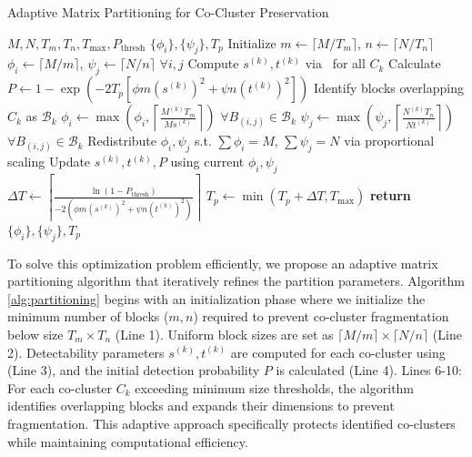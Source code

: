 \documentclass[journal]{IEEEtran}
\begin{document}
\begin{algorithm}[!t]
    \caption{Adaptive Matrix Partitioning for Co-Cluster Preservation}
    \begin{algorithmic}[1]
        \REQUIRE $M, N, T_m, T_n, T_{\text{max}}, P_{\text{thresh}}$
        \ENSURE $\{\phi_i\}, \{\psi_j\}, T_p$
        \STATE Initialize $m \gets \lceil M / T_m \rceil$, $n \gets \lceil N / T_n \rceil$ 
        \STATE $\phi_i \gets \lceil M/m \rceil$, $\psi_j \gets \lceil N/n \rceil$ $\forall i,j$ 
        \STATE Compute $s^{(k)}, t^{(k)}$ via~ for all $C_k$
        \STATE Calculate $P \gets 1 - \exp\left( -2 T_p \left[ \phi m (s^{(k)})^2 + \psi n (t^{(k)})^2 \right] \right)$
        \STATE Identify blocks overlapping $C_k$ as $\mathcal{B}_k$
        \STATE $\phi_i \gets \max\left( \phi_i, \left\lceil \frac{M^{(k)} T_m}{M s^{(k)}} \right\rceil \right)$ $\forall B_{(i,j)} \in \mathcal{B}_k$
        \STATE $\psi_j \gets \max\left( \psi_j, \left\lceil \frac{N^{(k)} T_n}{N t^{(k)}} \right\rceil \right)$ $\forall B_{(i,j)} \in \mathcal{B}_k$
        \ENDFOR
        \STATE Redistribute $\phi_i, \psi_j$ s.t. $\sum \phi_i = M$, $\sum \psi_j = N$ via proportional scaling
        \STATE Update $s^{(k)}, t^{(k)}, P$ using current $\phi_i, \psi_j$
        \STATE $\Delta T \gets \left\lceil \frac{\ln(1 - P_{\text{thresh}})}{-2 \left( \phi m (s^{(k)})^2 + \psi n (t^{(k)})^2 \right)} \right\rceil$
        \STATE $T_p \gets \min(T_p + \Delta T, T_{\text{max}})$
        \ENDIF
        \ENDWHILE
        \STATE \textbf{return} $\{\phi_i\}, \{\psi_j\}, T_p$
    \end{algorithmic}
    \label{alg:partitioning}
\end{algorithm}

To solve this optimization problem efficiently, we propose an adaptive matrix partitioning algorithm that iteratively refines the partition parameters. Algorithm \ref{alg:partitioning} begins with an initialization phase where we initialize the minimum number of blocks ($m,n$) required to prevent co-cluster fragmentation below size $T_m \times T_n$ (Line 1). Uniform block sizes are set as $\lceil M/m \rceil \times \lceil N/n \rceil$ (Line 2). Detectability parameters $s^{(k)}, t^{(k)}$ are computed for each co-cluster using~ (Line 3), and the initial detection probability $P$ is calculated (Line 4).
    {\color{blue}Lines 6-10: For each co-cluster $C_k$ exceeding minimum size thresholds, the algorithm identifies overlapping blocks and expands their dimensions to prevent fragmentation. This adaptive approach specifically protects identified co-clusters while maintaining computational efficiency.}
\end{document}
